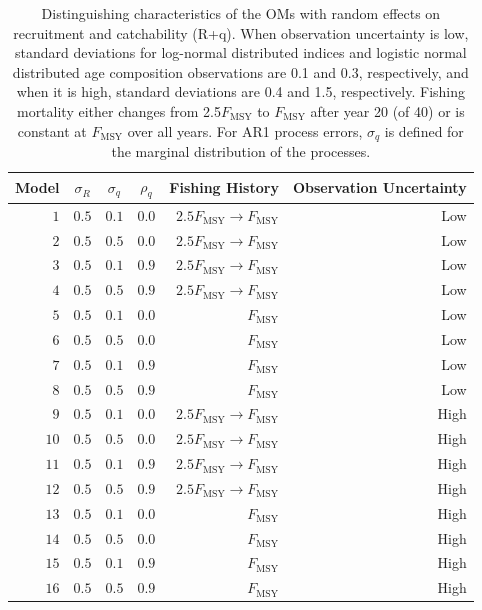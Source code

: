 \documentclass[
  12pt,
]{article}
\begin{document}
\begin{table}
\caption{Distinguishing characteristics of the OMs with random effects on recruitment and catchability (R+q). When observation uncertainty is low, standard deviations for log-normal distributed indices and logistic normal distributed age composition observations are 0.1 and 0.3, respectively, and when it is high, standard deviations are 0.4 and 1.5, respectively. Fishing mortality either changes from 2.5$F_{\text{MSY}}$ to $F_{\text{MSY}}$ after year 20 (of 40) or is constant at $F_{\text{MSY}}$ over all years. For AR1 process errors, $\sigma_q$ is defined for the marginal distribution of the processes.}\label{q_om_table}
{\begin{center}
\begin{tabular}{rrrrrr}
\hline\hline
\multicolumn{1}{c}{Model}&\multicolumn{1}{c}{$\sigma_R$}&\multicolumn{1}{c}{$\sigma_{q}$}&\multicolumn{1}{c}{$\rho_{q}$}&\multicolumn{1}{c}{Fishing History}&\multicolumn{1}{c}{Observation Uncertainty}\tabularnewline
\hline
$ 1$&$0.5$&$0.1$&$0.0$&$2.5 F_{\text{MSY}} \rightarrow F_{\text{MSY}}$&Low\tabularnewline
$ 2$&$0.5$&$0.5$&$0.0$&$2.5 F_{\text{MSY}} \rightarrow F_{\text{MSY}}$&Low\tabularnewline
$ 3$&$0.5$&$0.1$&$0.9$&$2.5 F_{\text{MSY}} \rightarrow F_{\text{MSY}}$&Low\tabularnewline
$ 4$&$0.5$&$0.5$&$0.9$&$2.5 F_{\text{MSY}} \rightarrow F_{\text{MSY}}$&Low\tabularnewline
$ 5$&$0.5$&$0.1$&$0.0$&$F_{\text{MSY}}$&Low\tabularnewline
$ 6$&$0.5$&$0.5$&$0.0$&$F_{\text{MSY}}$&Low\tabularnewline
$ 7$&$0.5$&$0.1$&$0.9$&$F_{\text{MSY}}$&Low\tabularnewline
$ 8$&$0.5$&$0.5$&$0.9$&$F_{\text{MSY}}$&Low\tabularnewline
$ 9$&$0.5$&$0.1$&$0.0$&$2.5 F_{\text{MSY}} \rightarrow F_{\text{MSY}}$&High\tabularnewline
$10$&$0.5$&$0.5$&$0.0$&$2.5 F_{\text{MSY}} \rightarrow F_{\text{MSY}}$&High\tabularnewline
$11$&$0.5$&$0.1$&$0.9$&$2.5 F_{\text{MSY}} \rightarrow F_{\text{MSY}}$&High\tabularnewline
$12$&$0.5$&$0.5$&$0.9$&$2.5 F_{\text{MSY}} \rightarrow F_{\text{MSY}}$&High\tabularnewline
$13$&$0.5$&$0.1$&$0.0$&$F_{\text{MSY}}$&High\tabularnewline
$14$&$0.5$&$0.5$&$0.0$&$F_{\text{MSY}}$&High\tabularnewline
$15$&$0.5$&$0.1$&$0.9$&$F_{\text{MSY}}$&High\tabularnewline
$16$&$0.5$&$0.5$&$0.9$&$F_{\text{MSY}}$&High\tabularnewline
\hline
\end{tabular}\end{center}
}
\end{table}
\end{document}

